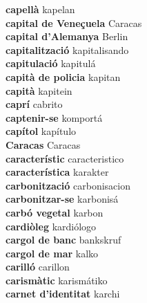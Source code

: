 \textbf{ capellà  } kapelan \\
\textbf{ capital de Veneçuela  } Caracas \\
\textbf{ capital d’Alemanya  } Berlin \\
\textbf{ capitalització  } kapitalisando \\
\textbf{ capitulació  } kapitulá \\
\textbf{ capità de policia  } kapitan \\
\textbf{ capità  } kapitein \\
\textbf{ caprí  } cabrito \\
\textbf{ captenir-se  } komportá \\
\textbf{ capítol  } kapítulo \\
\textbf{ Caracas  } Caracas \\
\textbf{ característic  } caracteristico \\
\textbf{ característica  } karakter \\
\textbf{ carbonització  } carbonisacion \\
\textbf{ carbonitzar-se  } karbonisá \\
\textbf{ carbó vegetal  } karbon \\
\textbf{ cardiòleg  } kardiólogo \\
\textbf{ cargol de banc  } bankskruf \\
\textbf{ cargol de mar  } kalko \\
\textbf{ carilló  } carillon \\
\textbf{ carismàtic  } karismátiko \\
\textbf{ carnet d’identitat  } karchi \\
